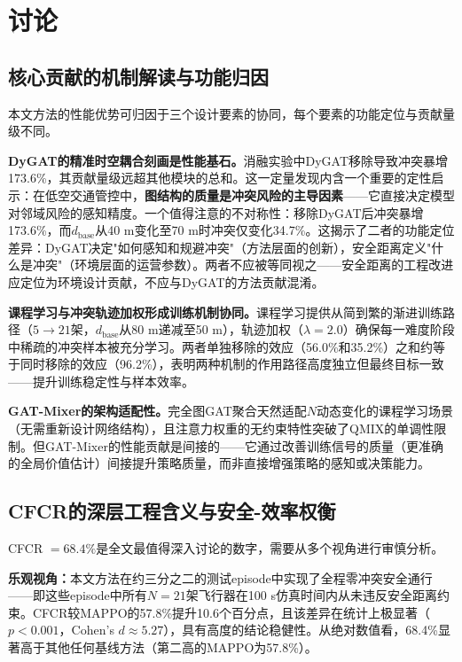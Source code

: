\documentclass[12pt,a4paper,UTF8]{ctexart}
\begin{document}
\section{讨论}

\subsection{核心贡献的机制解读与功能归因}

本文方法的性能优势可归因于三个设计要素的协同，每个要素的功能定位与贡献量级不同。

\textbf{DyGAT的精准时空耦合刻画是性能基石。}消融实验中DyGAT移除导致冲突暴增173.6\%，其贡献量级远超其他模块的总和。这一定量发现内含一个重要的定性启示：在低空交通管控中，\textbf{图结构的质量是冲突风险的主导因素}——它直接决定模型对邻域风险的感知精度。一个值得注意的不对称性：移除DyGAT后冲突暴增173.6\%，而$d_{\text{base}}$从40 m变化至70 m时冲突仅变化34.7\%。这揭示了二者的功能定位差异：DyGAT决定"如何感知和规避冲突"（方法层面的创新），安全距离定义"什么是冲突"（环境层面的运营参数）。两者不应被等同视之——安全距离的工程改进应定位为环境设计贡献，不应与DyGAT的方法贡献混淆。

\textbf{课程学习与冲突轨迹加权形成训练机制协同。}课程学习提供从简到繁的渐进训练路径（$5 \to 21$架，$d_{\text{base}}$从80 m递减至50 m），轨迹加权（$\lambda=2.0$）确保每一难度阶段中稀疏的冲突样本被充分学习。两者单独移除的效应（56.0\%和35.2\%）之和约等于同时移除的效应（96.2\%），表明两种机制的作用路径高度独立但最终目标一致——提升训练稳定性与样本效率。

\textbf{GAT-Mixer的架构适配性。}完全图GAT聚合天然适配$N$动态变化的课程学习场景（无需重新设计网络结构），且注意力权重的无约束特性突破了QMIX的单调性限制。但GAT-Mixer的性能贡献是间接的——它通过改善训练信号的质量（更准确的全局价值估计）间接提升策略质量，而非直接增强策略的感知或决策能力。

\subsection{CFCR的深层工程含义与安全-效率权衡}

CFCR $= 68.4\%$是全文最值得深入讨论的数字，需要从多个视角进行审慎分析。

\textbf{乐观视角：}本文方法在约三分之二的测试episode中实现了全程零冲突安全通行——即这些episode中所有$N=21$架飞行器在100 s仿真时间内从未违反安全距离约束。CFCR较MAPPO的57.8\%提升10.6个百分点，且该差异在统计上极显著（$p<0.001$，Cohen's $d \approx 5.27$），具有高度的结论稳健性。从绝对数值看，68.4\%显著高于其他任何基线方法（第二高的MAPPO为57.8\%）。
\end{document}

